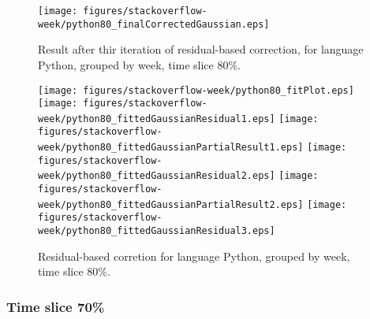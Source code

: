 \begin{figure}[]
\centering
{\texttt{[image: figures/stackoverflow-week/python80\_finalCorrectedGaussian.eps]}}
\caption{Result after thir iteration of residual-based correction, for language Python, grouped by week, time slice 80\%.}
\end{figure}


\begin{figure}[hb]
\centering
{}
{\texttt{[image: figures/stackoverflow-week/python80\_fitPlot.eps]}}
{\texttt{[image: figures/stackoverflow-week/python80\_fittedGaussianResidual1.eps]}}
{\texttt{[image: figures/stackoverflow-week/python80\_fittedGaussianPartialResult1.eps]}}
{\texttt{[image: figures/stackoverflow-week/python80\_fittedGaussianResidual2.eps]}}
{\texttt{[image: figures/stackoverflow-week/python80\_fittedGaussianPartialResult2.eps]}}
{\texttt{[image: figures/stackoverflow-week/python80\_fittedGaussianResidual3.eps]}}
\caption{Residual-based corretion for language Python, grouped by week, time slice 80\%.}
\end{figure}


\clearpage 
\newpage 


\FloatBarrier

\subsubsection{Time slice 70\%}


